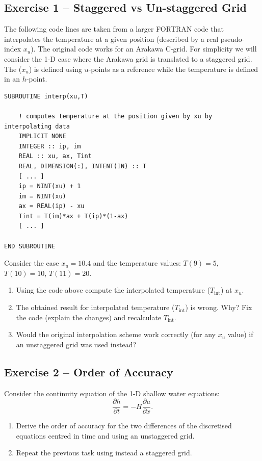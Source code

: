 \begin{question}
    
\subsection*{Exercise 1 -- Staggered vs Un-staggered Grid}

The following code lines are taken from a larger FORTRAN code that interpolates the
temperature at a given position (described by a real pseudo-index $x_u$). The original code
works for an Arakawa C-grid. For simplicity we will consider the 1-D case where the
Arakawa grid is translated to a staggered grid. The ($x_u$) is defined using $u$-points as a
reference while the temperature is defined in an $h$-point.

\begin{verbatim}
SUBROUTINE interp(xu,T)

    ! computes temperature at the position given by xu by interpolating data
    IMPLICIT NONE
    INTEGER :: ip, im
    REAL :: xu, ax, Tint
    REAL, DIMENSION(:), INTENT(IN) :: T
    [ ... ]
    ip = NINT(xu) + 1
    im = NINT(xu)
    ax = REAL(ip) - xu
    Tint = T(im)*ax + T(ip)*(1-ax)
    [ ... ]

END SUBROUTINE
\end{verbatim}

Consider the case $x_u = 10.4$ and the temperature values:
$T(9) = 5$, $T(10) = 10$, $T(11) = 20$.

\begin{enumerate}
    \item[(a)] Using the code above compute the interpolated temperature ($T_{\text{int}}$) at $x_u$.
    
    \item[(b)] The obtained result for interpolated temperature ($T_{\text{int}}$) is wrong. Why? 
    Fix the code (explain the changes) and recalculate $T_{\text{int}}$.
    
    \item[(c)] Would the original interpolation scheme work correctly (for any $x_u$ value) if an
    unstaggered grid was used instead?
\end{enumerate}

\subsection*{Exercise 2 -- Order of Accuracy}

Consider the continuity equation of the 1-D shallow water equations:
\[
\frac{\partial h}{\partial t} = -H \frac{\partial u}{\partial x}.
\]

\begin{enumerate}
    \item[(a)] Derive the order of accuracy for the two differences of the discretised equations
    centred in time and using an unstaggered grid.
    
    \item[(b)] Repeat the previous task using instead a staggered grid.
\end{enumerate}

\end{question}
